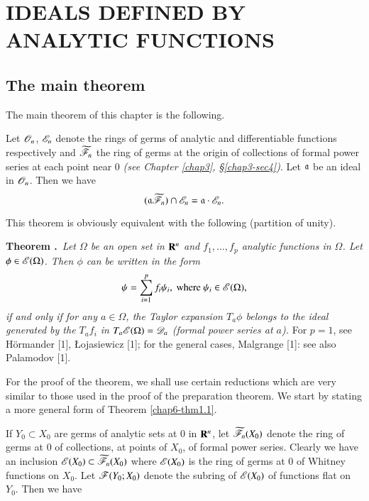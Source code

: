 \chapter{IDEALS DEFINED BY ANALYTIC FUNCTIONS}\label{chap6}

\section{The main theorem}\label{chap6-sec1}

The main theorem of this chapter is the following.

\begin{theorem}\label{chap6-thm1.1}
Let $\mathscr{O}_{n}$, $\mathscr{E}_{n}$ denote the rings of germs of analytic and differentiable functions respectively and $\widetilde{\mathscr{F}}_{n}$ the ring of germs at the origin of collections of formal power series at each point near $0$ {\em (see Chapter \ref{chap3}, \S\ref{chap3-sec4})}. Let $\mathfrak{a}$ be an ideal in $\mathscr{O}_{n}$. Then we have
$$
(\mathfrak{a}\widetilde{\mathscr{F}}_{n})\cap\mathscr{E}_{n}=\mathfrak{a}\cdot \mathscr{E}_{n}.
$$
\end{theorem}

This theorem is obviously equivalent with the following (partition of unity).

\medskip
\noindent
{\bf Theorem .\label{chap6-thm1.1'}}~{\em Let $\Omega$ be an open set in $\mathbf{R}^{n}$ and $f_{1},\ldots,f_{p}$ analytic functions in $\Omega$. Let $\phi\in\mathscr{E}(\Omega)$. Then $\phi$ can be written in the form}
$$
\psi =\sum\limits^{p}_{i=1}f_{i}\psi_{i},\text{ where } \psi_{i}\in \mathscr{E}(\Omega),
$$
{\em if and only if for any $a\in \Omega$, the Taylor expansion $T_{a}\phi$ belongs to the ideal generated by the $T_{a}f_{i}$ in $T_{a}\mathscr{E}(\Omega)=\mathscr{D}_{a}$ (formal power series at $a$).} For $p=1$, see H\"ormander [1], {\L}ojasiewicz [1]; for the general cases, Malgrange [1]: see also Palamodov [1].

For the proof of the theorem, we shall use certain reductions which are very similar to those used in the proof of the preparation theorem. We start by stating a more general form of Theorem \ref{chap6-thm1.1}.

If $Y_{0}\subset X_{0}$ are germs of analytic sets at $0$ in $\mathbf{R}^{n}$, let $\widetilde{\mathscr{F}}_{n}(X_{0})$ denote the ring of germs at $0$ of collections, at points of $X_{0}$, of formal power series. Clearly we have an inclusion $\mathscr{E}(X_{0})\subset \widetilde{\mathscr{F}}_{n}(X_{0})$ where $\mathscr{E}(X_{0})$ is the ring of germs at $0$ of Whitney functions on $X_{0}$. Let $\mathscr{F}(Y_{0};X_{0})$ denote the subring of $\mathscr{E}(X_{0})$ of functions flat on $Y_{0}$. Then we have

